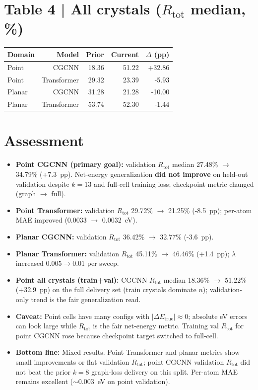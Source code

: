 \documentclass[11pt,a4paper]{article}
\begin{document}
\section*{Table 4 | All crystals ($R_{\mathrm{tot}}$ median, \%)}

\begin{center}
\small
\begin{tabular}{l r r r r}
  \toprule
  Domain & Model & Prior & Current & $\Delta$ (pp) \\
  \midrule
  Point  & CGCNN       & 18.36 & 51.22 & +32.86 \\
  Point  & Transformer & 29.32 & 23.39 & -5.93 \\
  Planar & CGCNN       & 31.28 & 21.28 & -10.00 \\
  Planar & Transformer & 53.74 & 52.30 & -1.44 \\
  \bottomrule
\end{tabular}
\end{center}

\section*{Assessment}
\begin{itemize}
  \item \textbf{Point CGCNN (primary goal):} validation $R_{\mathrm{tot}}$ median 27.48\% $\rightarrow$ 34.79\% (+7.3~pp). Net-energy generalization \textbf{did not improve} on held-out validation despite $k=13$ and full-cell training loss; checkpoint metric changed (graph $\rightarrow$ full).
  \item \textbf{Point Transformer:} validation $R_{\mathrm{tot}}$ 29.72\% $\rightarrow$ 21.25\% (-8.5~pp); per-atom MAE improved (0.0033 $\rightarrow$ 0.0032~eV).
  \item \textbf{Planar CGCNN:} validation $R_{\mathrm{tot}}$ 36.42\% $\rightarrow$ 32.77\% (-3.6~pp).
  \item \textbf{Planar Transformer:} validation $R_{\mathrm{tot}}$ 45.11\% $\rightarrow$ 46.46\% (+1.4~pp); $\lambda$ increased $0.005 \rightarrow 0.01$ per sweep.
  \item \textbf{Point all crystals (train+val):} CGCNN $R_{\mathrm{tot}}$ median 18.36\% $\rightarrow$ 51.22\% (+32.9~pp) on the full delivery set (train crystals dominate $n$); validation-only trend is the fair generalization read.
  \item \textbf{Caveat:} Point cells have many configs with $|\Delta E_{\mathrm{true}}|\approx 0$; absolute eV errors can look large while $R_{\mathrm{tot}}$ is the fair net-energy metric. Training val $R_{\mathrm{tot}}$ for point CGCNN rose because checkpoint target switched to full-cell.
  \item \textbf{Bottom line:} Mixed results. Point Transformer and planar metrics show small improvements or flat validation $R_{\mathrm{tot}}$; point CGCNN validation $R_{\mathrm{tot}}$ did not beat the prior $k=8$ graph-loss delivery on this split. Per-atom MAE remains excellent ($\sim 0.003$~eV on point validation).
\end{itemize}
\end{document}
